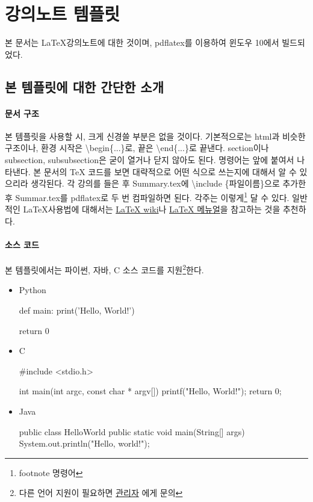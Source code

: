 \section{강의노트 템플릿} 

본 문서는 \LaTeX 강의노트에 대한 것이며, pdflatex를 이용하여 윈도우 10에서 빌드되었다. 

\subsection{본 템플릿에 대한 간단한 소개}

\paragraph{문서 구조} 본 템플릿을 사용할 시, 크게 신경쓸 부분은 없을 것이다. 기본적으로는 html과 비슷한 구조이나, 환경 시작은 {\textbackslash}begin\{...\}로, 끝은 {\textbackslash}end\{...\}로 끝낸다. section이나 subsection, subsubsection은 굳이 열거나 닫지 않아도 된다. 명령어는  앞에 붙여서 나타낸다. 본 문서의 TeX 코드를 보면 대략적으로 어떤 식으로 쓰는지에 대해서 알 수 있으리라 생각된다. 각 강의를 들은 후 Summary.tex에 \textbackslash include \{파일이름\}으로 추가한 후 Summar.tex를 pdflatex로 두 번 컴파일하면 된다. 각주는 이렇게\footnote{footnote 명령어} 달 수 있다. 일반적인 \LaTeX 사용법에 대해서는 \href{http://legacy-wiki.dgoon.net/doku.php?id=latex:latex}{LaTeX wiki}나 \href{http://ftp.isu.edu.tw/pub/Unix/CTAN/info/lshort/korean/lshort-kr.pdf}{LaTeX 메뉴얼}을 참고하는 것을 추천하다.

\paragraph{소스 코드} 본 템플릿에서는 파이썬, 자바, C 소스 코드를 지원\footnote{다른 언어 지원이 필요하면 \href{mailto:principia\_12@kaist.ac.kr}{관리자} 에게 문의}한다. 
\begin{itemize} 

\item{Python} 

\begin{Python} 
def main:
    print('Hello, World!')
    
    return 0
    
\end{Python} 

\item{C}


\begin{C} 
#include <stdio.h>

int main(int argc, const char * argv[]) 
{
    printf("Hello, World!\n");
    return 0;
}    
\end{C} 

\item{Java}

\begin{Java} 
public class HelloWorld {
    public static void main(String[] args) {
        System.out.println("Hello, world!");
    }
}
\end{Java} 

\end{itemize}
